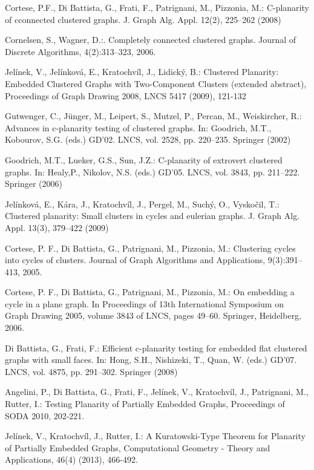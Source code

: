 \begin{thebibliography}{9}

	Cortese, P.F., Di Battista, G., Frati, F., Patrignani, M., Pizzonia, M.: C-planarity of cconnected clustered graphs. J. Graph Alg. Appl. 12(2), 225–262 (2008)

	Cornelsen, S., Wagner, D.:. Completely connected clustered graphs. Journal of Discrete Algorithms, 4(2):313–323, 2006.

	Jelínek, V., Jelínková, E., Kratochvíl, J., Lidický, B.: Clustered Planarity: Embedded Clustered Graphs with Two-Component Clusters (extended abstract), Proceedings of Graph Drawing 2008, LNCS 5417 (2009), 121-132

	Gutwenger, C., Jünger, M., Leipert, S., Mutzel, P., Percan, M., Weiskircher, R.: Advances in c-planarity testing of clustered graphs. In: Goodrich, M.T., Kobourov, S.G. (eds.) GD’02. LNCS, vol. 2528, pp. 220–235. Springer (2002)

	Goodrich, M.T., Lueker, G.S., Sun, J.Z.: C-planarity of extrovert clustered graphs. In: Healy,P., Nikolov, N.S. (eds.) GD’05. LNCS, vol. 3843, pp. 211–222. Springer (2006)

	Jelínková, E., Kára, J., Kratochvíl, J., Pergel, M., Suchý, O., Vyskočil, T.: Clustered planarity: Small clusters in cycles and eulerian graphs. J. Graph Alg. Appl. 13(3), 379–422 (2009)

Cortese, P. F., Di Battista, G., Patrignani, M., Pizzonia, M.: Clustering cycles into cycles of clusters. Journal of Graph Algorithms and Applications,
9(3):391–413, 2005.

	Cortese, P. F., Di Battista, G., Patrignani, M., Pizzonia, M.: On embedding a cycle in a plane graph. In Proceedings of 13th International Symposium on Graph Drawing 2005, volume 3843 of LNCS, pages 49–60. Springer, Heidelberg, 2006.

	Di Battista, G., Frati, F.: Efficient c-planarity testing for embedded flat clustered graphs with small faces. In: Hong, S.H., Nishizeki, T., Quan, W. (eds.) GD’07. LNCS, vol. 4875, pp. 291–302. Springer (2008)

	Angelini, P., Di Battista, G., Frati, F., Jelínek, V., Kratochvíl, J., Patrignani, M., Rutter, I.: Testing Planarity of Partially Embedded Graphs, Proceedings of SODA 2010, 202-221.

	Jelínek, V., Kratochvíl, J., Rutter, I.: A Kuratowski-Type Theorem for Planarity of Partially Embedded Graphs, Computational Geometry - Theory and Applications, 46(4) (2013), 466-492.

\end{thebibliography}